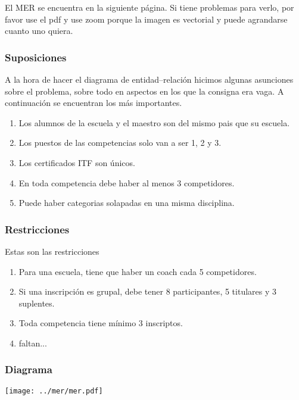 
El MER se encuentra en la siguiente página. Si tiene problemas para verlo, por favor use el pdf y use zoom porque la imagen es vectorial y puede agrandarse cuanto uno quiera.

\subsubsection{Suposiciones}

A la hora de hacer el diagrama de entidad--relación hicimos algunas asunciones sobre el problema, sobre todo en aspectos en los que la consigna era vaga. A continuación se encuentran los más importantes.

\begin{enumerate}
	\item Los alumnos de la escuela y el maestro son del mismo pais que su escuela.
	\item Los puestos de las competencias solo van a ser 1, 2 y 3.
	\item Los certificados ITF son únicos.
	\item En toda competencia debe haber al menos 3 competidores.
	\item Puede haber categorias solapadas en una misma disciplina.
\end{enumerate}


\subsubsection{Restricciones}

Estas son las restricciones 

\begin{enumerate}
  \item Para una escuela, tiene que haber un coach cada 5 competidores.
  \item Si una inscripción es grupal, debe tener 8 participantes, 5 titulares y 3 suplentes.
  \item Toda competencia tiene mínimo 3 inscriptos.
  \item faltan...
\end{enumerate}

\subsubsection{Diagrama}

\newpage

\texttt{[image: ../mer/mer.pdf]}

